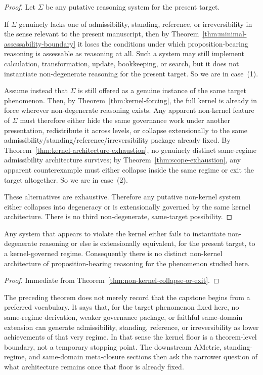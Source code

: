 \begin{proof}
Let $\Sigma$ be any putative reasoning system for the present target.

If $\Sigma$ genuinely lacks one of admissibility, standing, reference, or irreversibility in the sense relevant to the present manuscript, then by Theorem~\ref{thm:minimal-assessability-boundary} it loses the conditions under which proposition-bearing reasoning is assessable as reasoning at all. Such a system may still implement calculation, transformation, update, bookkeeping, or search, but it does not instantiate non-degenerate reasoning for the present target. So we are in case~(1).

Assume instead that $\Sigma$ is still offered as a genuine instance of the same target phenomenon. Then, by Theorem~\ref{thm:kernel-forcing}, the full kernel is already in force wherever non-degenerate reasoning exists. Any apparent non-kernel feature of $\Sigma$ must therefore either hide the same governance work under another presentation, redistribute it across levels, or collapse extensionally to the same admissibility/standing/reference/irreversibility package already fixed. By Theorem~\ref{thm:kernel-architecture-exhaustion}, no genuinely distinct same-regime admissibility architecture survives; by Theorem~\ref{thm:scope-exhaustion}, any apparent counterexample must either collapse inside the same regime or exit the target altogether. So we are in case~(2).

These alternatives are exhaustive. Therefore any putative non-kernel system either collapses into degeneracy or is extensionally governed by the same kernel architecture. There is no third non-degenerate, same-target possibility.
\end{proof}

\begin{corollary}
Any system that appears to violate the kernel either fails to instantiate non-degenerate reasoning or else is extensionally equivalent, for the present target, to a kernel-governed regime. Consequently there is no distinct non-kernel architecture of proposition-bearing reasoning for the phenomenon studied here.
\end{corollary}

\begin{proof}
Immediate from Theorem~\ref{thm:non-kernel-collapse-or-exit}.
\end{proof}

\begin{remark}
The preceding theorem does not merely record that the capstone begins from a preferred vocabulary. It says that, for the target phenomenon fixed here, no same-regime derivation, weaker governance package, or faithful same-domain extension can generate admissibility, standing, reference, or irreversibility as lower achievements of that very regime. In that sense the kernel floor is a theorem-level boundary, not a temporary stopping point. The downstream AMetric, standing-regime, and same-domain meta-closure sections then ask the narrower question of what architecture remains once that floor is already fixed.
\end{remark}

